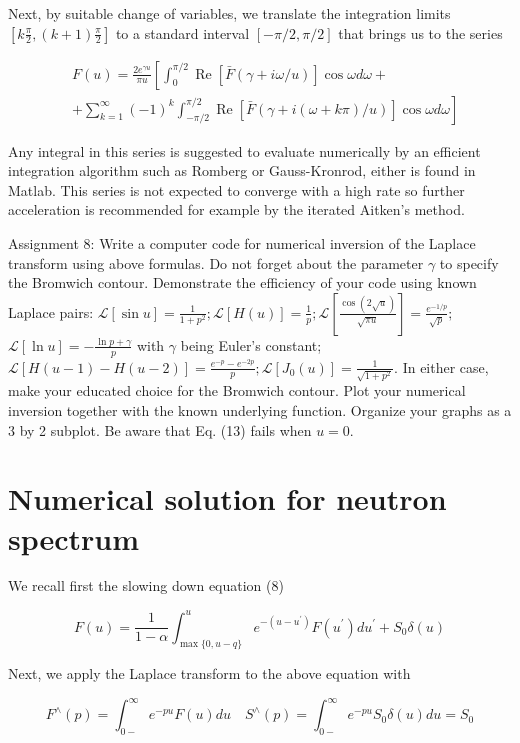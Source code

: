 \documentclass[10pt]{article}
\begin{document}
Next, by suitable change of variables, we translate the integration limits $\left[k \frac{\pi}{2},(k+1) \frac{\pi}{2}\right]$ to a standard interval $[-\pi / 2, \pi / 2]$ that brings us to the series

$$
\begin{aligned}
& F(u)=\frac{2 e^{\gamma u}}{\pi u}\left[\int_{0}^{\pi / 2} \operatorname{Re}[\bar{F}(\gamma+i \omega / u)] \cos \omega d \omega+\right. \\
& \left.+\sum_{k=1}^{\infty}(-1)^{k} \int_{-\pi / 2}^{\pi / 2} \operatorname{Re}[\bar{F}(\gamma+i(\omega+k \pi) / u)] \cos \omega d \omega\right]
\end{aligned}
$$

Any integral in this series is suggested to evaluate numerically by an efficient integration algorithm such as Romberg or Gauss-Kronrod, either is found in Matlab. This series is not expected to converge with a high rate so further acceleration is recommended for example by the iterated Aitken's method.

Assignment 8: Write a computer code for numerical inversion of the Laplace transform using above formulas. Do not forget about the parameter $\gamma$ to specify the Bromwich contour. Demonstrate the efficiency of your code using known Laplace pairs: $\mathcal{L}[\sin u]=\frac{1}{1+p^{2}} ; \mathcal{L}[H(u)]=\frac{1}{p} ; \mathcal{L}\left[\frac{\cos (2 \sqrt{u})}{\sqrt{\pi u}}\right]=\frac{e^{-1 / p}}{\sqrt{p}} ;$ $\mathcal{L}[\ln u]=-\frac{\ln p+\gamma}{p}$ with $\gamma$ being Euler's constant; $\mathcal{L}[H(u-1)-H(u-2)]=\frac{e^{-p}-e^{-2 p}}{p} ; \mathcal{L}\left[J_{0}(u)\right]=\frac{1}{\sqrt{1+p^{2}}}$. In either case, make your educated choice for the Bromwich contour. Plot your numerical inversion together with the known underlying function. Organize your graphs as a 3 by 2 subplot. Be aware that Eq. (13) fails when $u=0$.

\section{Numerical solution for neutron spectrum}
We recall first the slowing down equation (8)

$$
F(u)=\frac{1}{1-\alpha} \int_{\max \{0, u-q\}}^{u} e^{-\left(u-u^{\prime}\right)} F\left(u^{\prime}\right) d u^{\prime}+S_{0} \delta(u)
$$

Next, we apply the Laplace transform to the above equation with

$$
F^{\wedge}(p)=\int_{0-}^{\infty} e^{-p u} F(u) d u \quad S^{\wedge}(p)=\int_{0-}^{\infty} e^{-p u} S_{0} \delta(u) d u=S_{0}
$$
\end{document}
